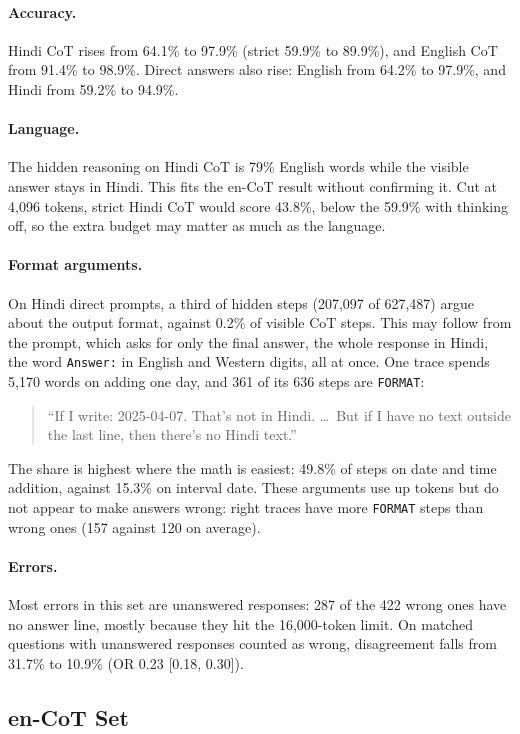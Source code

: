 \documentclass[11pt]{article}
\begin{document}
\paragraph{Accuracy.}
Hindi CoT rises from 64.1\% to 97.9\% (strict 59.9\% to 89.9\%), and English CoT from 91.4\% to 98.9\%. Direct answers also rise: English from 64.2\% to 97.9\%, and Hindi from 59.2\% to 94.9\%.

\paragraph{Language.}
The hidden reasoning on Hindi CoT is 79\% English words while the visible answer stays in Hindi. This fits the en-CoT result without confirming it. Cut at 4,096 tokens, strict Hindi CoT would score 43.8\%, below the 59.9\% with thinking off, so the extra budget may matter as much as the language.

\paragraph{Format arguments.}
On Hindi direct prompts, a third of hidden steps (207,097 of 627,487) argue about the output format, against 0.2\% of visible CoT steps. This may follow from the prompt, which asks for only the final answer, the whole response in Hindi, the word \texttt{Answer:} in English and Western digits, all at once. One trace spends 5,170 words on adding one day, and 361 of its 636 steps are \texttt{FORMAT}:
\begin{quote}
``If I write: 2025-04-07. That's not in Hindi. \dots\ But if I have no text outside the last line, then there's no Hindi text.''
\end{quote}
The share is highest where the math is easiest: 49.8\% of steps on date and time addition, against 15.3\% on interval date. These arguments use up tokens but do not appear to make answers wrong: right traces have more \texttt{FORMAT} steps than wrong ones (157 against 120 on average).

\paragraph{Errors.}
Most errors in this set are unanswered responses: 287 of the 422 wrong ones have no answer line, mostly because they hit the 16,000-token limit. On matched questions with unanswered responses counted as wrong, disagreement falls from 31.7\% to 10.9\% (OR 0.23 [0.18, 0.30]).

\subsection{en-CoT Set}
\label{sec:encot}
\end{document}
